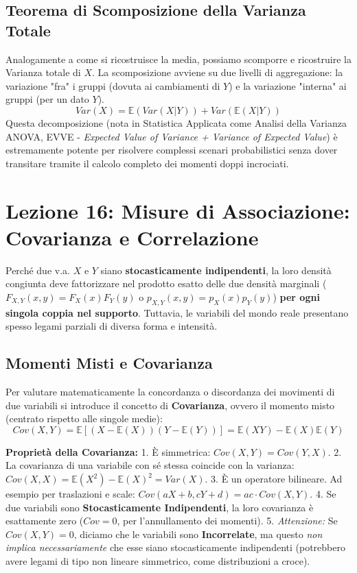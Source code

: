 \documentclass[12pt, a4paper]{article}
\begin{document}
\subsection{Teorema di Scomposizione della Varianza Totale}
Analogamente a come si ricostruisce la media, possiamo scomporre e ricostruire la Varianza totale di $X$.
La scomposizione avviene su due livelli di aggregazione: la variazione "fra" i gruppi (dovuta ai cambiamenti di $Y$) e la variazione "interna" ai gruppi (per un dato $Y$).
$$ Var(X) = \mathbb{E}(Var(X|Y)) + Var(\mathbb{E}(X|Y)) $$
Questa decomposizione (nota in Statistica Applicata come Analisi della Varianza ANOVA, EVVE - \textit{Expected Value of Variance + Variance of Expected Value}) è estremamente potente per risolvere complessi scenari probabilistici senza dover transitare tramite il calcolo completo dei momenti doppi incrociati.


\section{Lezione 16: Misure di Associazione: Covarianza e Correlazione}

Perché due v.a. $X$ e $Y$ siano \textbf{stocasticamente indipendenti}, la loro densità congiunta deve fattorizzare nel prodotto esatto delle due densità marginali ($F_{X,Y}(x,y) = F_X(x)F_Y(y)$ o $p_{X,Y}(x,y) = p_X(x)p_Y(y)$) \textbf{per ogni singola coppia nel supporto}.
Tuttavia, le variabili del mondo reale presentano spesso legami parziali di diversa forma e intensità. 

\newpage

\subsection{Momenti Misti e Covarianza}
Per valutare matematicamente la concordanza o discordanza dei movimenti di due variabili si introduce il concetto di \textbf{Covarianza}, ovvero il momento misto (centrato rispetto alle singole medie):
$$ Cov(X,Y) = \mathbb{E}[(X - \mathbb{E}(X))(Y - \mathbb{E}(Y))] = \mathbb{E}(XY) - \mathbb{E}(X)\mathbb{E}(Y) $$

\textbf{Proprietà della Covarianza:}
1. È simmetrica: $Cov(X,Y) = Cov(Y,X)$.
2. La covarianza di una variabile con sé stessa coincide con la varianza: $Cov(X,X) = \mathbb{E}(X^2) - \mathbb{E}(X)^2 = Var(X)$.
3. È un operatore bilineare. Ad esempio per traslazioni e scale: $Cov(aX+b, cY+d) = ac \cdot Cov(X,Y)$.
4. Se due variabili sono \textbf{Stocasticamente Indipendenti}, la loro covarianza è esattamente zero ($Cov=0$, per l'annullamento dei momenti).
5. \textit{Attenzione:} Se $Cov(X,Y)=0$, diciamo che le variabili sono \textbf{Incorrelate}, ma questo \textit{non implica necessariamente} che esse siano stocasticamente indipendenti (potrebbero avere legami di tipo non lineare simmetrico, come distribuzioni a croce).
\end{document}
